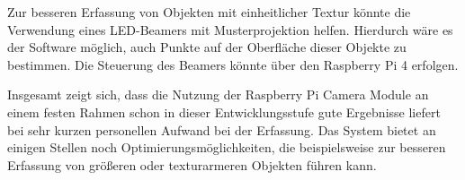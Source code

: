 \documentclass[./00PhotoBox.tex]{subfiles}
\begin{document}
Zur besseren Erfassung von Objekten mit einheitlicher Textur könnte die Verwendung eines LED-Beamers mit Musterprojektion helfen. Hierdurch wäre es der Software möglich, auch Punkte auf der Oberfläche dieser Objekte zu bestimmen. Die Steuerung des Beamers könnte über den Raspberry Pi 4 erfolgen.


Insgesamt zeigt sich, dass die Nutzung der Raspberry Pi Camera Module an einem festen Rahmen schon in dieser Entwicklungsstufe gute Ergebnisse liefert bei sehr kurzen personellen Aufwand bei der Erfassung. Das System bietet an einigen Stellen noch Optimierungsmöglichkeiten, die beispielsweise zur besseren Erfassung von größeren oder texturarmeren Objekten führen kann.


\biblio
\end{document}
